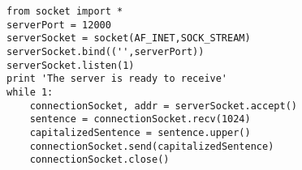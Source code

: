 \documentclass[varwidth=31.5em,crop]{standalone}
\begin{document}
\begin{verbatim}
from socket import *
serverPort = 12000
serverSocket = socket(AF_INET,SOCK_STREAM)
serverSocket.bind(('',serverPort))
serverSocket.listen(1)
print 'The server is ready to receive'
while 1:
    connectionSocket, addr = serverSocket.accept()
    sentence = connectionSocket.recv(1024)
    capitalizedSentence = sentence.upper()
    connectionSocket.send(capitalizedSentence)
    connectionSocket.close()
\end{verbatim}
\end{document}
